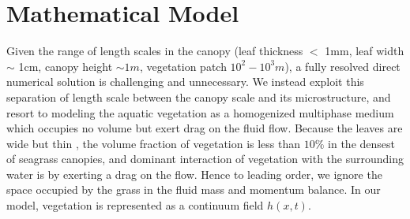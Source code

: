 \documentclass[12pt]{report}   %
\begin{document}
\chapter{Mathematical Model}
Given the range of length scales in the canopy (leaf thickness $<$ 1mm, leaf width $\sim$ 1cm, canopy height $\sim 1m$, vegetation patch $10^2-10^3 m$), a fully resolved direct numerical solution is challenging and unnecessary. We instead exploit this separation of length scale between the canopy scale and its microstructure, and resort to modeling the aquatic vegetation as a homogenized multiphase medium which occupies no volume but exert drag on the fluid flow.
Because the leaves are wide but thin , the volume fraction of vegetation is less than $10\%$ \cite{chandler96} in the densest of seagrass canopies, and dominant interaction of vegetation with the surrounding water is by exerting a drag on the flow. Hence to leading order, we ignore the space occupied by the grass in the fluid mass and momentum balance. In our model, vegetation is represented as a continuum field $h(x,t)$. 
\end{document}
